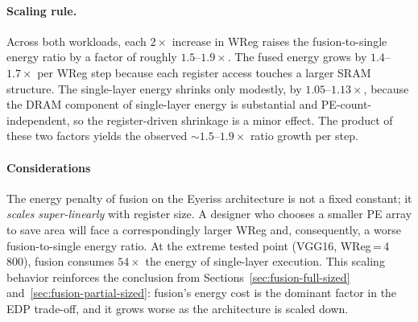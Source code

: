 \paragraph{Scaling rule.}
Across both workloads, each $2\times$ increase in WReg raises
the fusion-to-single energy ratio by a factor of roughly
$1.5$--$1.9\times$.
The fused energy grows by $1.4$--$1.7\times$ per WReg step
because each register access touches a larger SRAM structure.
The single-layer energy shrinks only modestly, by
$1.05$--$1.13\times$, because the DRAM component of single-layer
energy is substantial and PE-count-independent, so the
register-driven shrinkage is a minor effect.
The product of these two factors yields the observed
${\sim}1.5$--$1.9\times$ ratio growth per step.

\paragraph{Considerations}
The energy penalty of fusion on the Eyeriss architecture is not a
fixed constant; it \emph{scales super-linearly} with register size.
A designer who chooses a smaller PE array to save area will face a
correspondingly larger WReg and, consequently, a worse
fusion-to-single energy ratio.
At the extreme tested point (VGG16, WReg\,=\,4\,800), fusion
consumes $54\times$ the energy of single-layer execution.
This scaling behavior reinforces the conclusion from
Sections~\ref{sec:fusion-full-sized}
and~\ref{sec:fusion-partial-sized}: fusion's energy cost is
the dominant factor in the EDP trade-off, and it grows worse
as the architecture is scaled down.